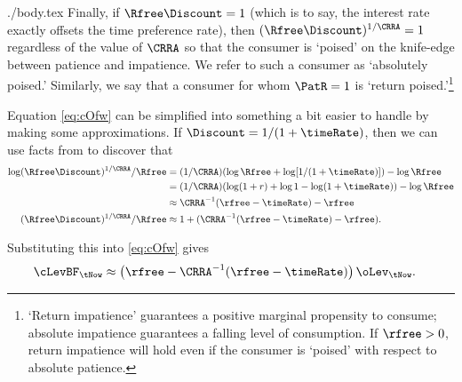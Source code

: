 \documentclass{handout}
\begin{document}
\begin{verbatimwrite}{./body.tex}
Finally, if $\Rfree\Discount=1$ (which is to say, the interest rate
exactly offsets the time preference rate), then $(\Rfree\Discount)^{1/\CRRA}=1$ regardless of the value of
$\CRRA$ so that the consumer is `poised' on the knife-edge between
patience and impatience.  We refer to
such a consumer as `absolutely poised.'  Similarly, we say that a consumer for
whom $\PatR=1$ is `return poised.'\footnote{`Return impatience' guarantees a positive marginal propensity to consume; absolute
impatience guarantees a falling level of consumption.  If $\rfree > 0$, return impatience
will hold even if the consumer is `poised' with respect to absolute patience.}




Equation \eqref{eq:cOfw} can be simplified into something a bit 
easier to handle by making some approximations.  If $\Discount = 
1/(1+\timeRate)$, then we can use facts from  to discover that
\begin{equation*}\begin{gathered}\begin{aligned}
      \log (\Rfree\Discount)^{1/\CRRA}/\Rfree & =  (1/\CRRA) (\log \Rfree + \log [1/(1+\timeRate) ]) - \log \Rfree  \\
     & =  (1/\CRRA) (\log(1+r) + \log 1 - \log (1+\timeRate) ) - \log \Rfree  \\
         & \approx  \CRRA^{-1}(\rfree -\timeRate)  - \rfree 
\\      (\Rfree\Discount)^{1/\CRRA}/\Rfree & \approx  1+(\CRRA^{-1}(\rfree-\timeRate)-\rfree)
.
\end{aligned}\end{gathered}\end{equation*}

Substituting this into \eqref{eq:cOfw} gives
\begin{equation}\begin{gathered}\begin{aligned}
        \cLevBF_{\tNow} & \approx  \left(\rfree-\CRRA^{-1}(\rfree-\timeRate)\right)\oLev_{\tNow} \label{eq:capprox}
.
\end{aligned}\end{gathered}\end{equation}


\end{verbatimwrite}
\end{document}

